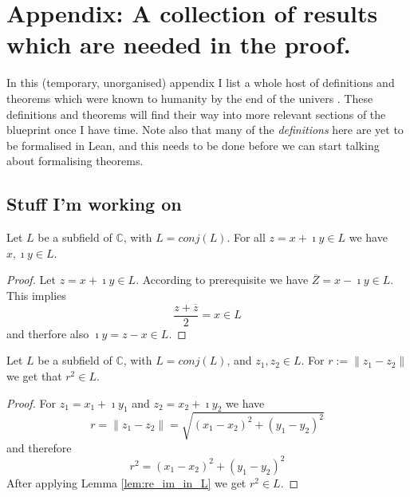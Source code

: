 \chapter{Appendix: A collection of results which are needed in the proof.}
\label{ch_bestiary}
In this (temporary, unorganised) appendix I list a whole host of definitions and theorems which were known to humanity by the end of the univers \cite{JAN_SCHRÖER:2023}. These definitions and theorems will find their way into more relevant sections of the blueprint once I have time. Note also that many of the \emph{definitions} here are yet to be formalised in Lean, and this needs to be done before we can start talking about formalising theorems.


\section*{Stuff I'm working on}




\begin{lemma}
    \label{lem:re_im_in_L}
    Let $L$ be a subfield of $\mathbb{C}$, with $L = conj(L)$. For all $z = x + \imath y \in L$ we have $x, \imath y \in L$.
\end{lemma}
\begin{proof}
    Let $z = x + \imath y \in L$. According to prerequisite we have $\overline{Z}=x-\imath y \in L$. This implies
    \begin{equation*}
        \frac{z + \overline{z}}{2} = x \in L
    \end{equation*}
    and therfore also $\imath y = z - x \in L$.
\end{proof}

\begin{lemma}
    \label{lem:dist_sqard_in_L}
    Let $L$ be a subfield of $\mathbb{C}$, with $L = conj(L)$, and $z_1, z_2 \in L$.
    For $r := \|z_1-z_2\|$ we get that $r^2 \in L$.
\end{lemma}
\begin{proof}
    For $z_1 = x_1 + \imath y_1$ and $z_2 = x_2 + \imath y_2$ we have
    \begin{equation*}
        r = \|z_1 - z_2\| = \sqrt{(x_1 - x_2)^2 + (y_1 - y_2)^2}
    \end{equation*}
    and therefore
    \begin{equation*}
        r^2 = (x_1 - x_2)^2 + (y_1 - y_2)^2 
    \end{equation*}
    After applying Lemma \ref{lem:re_im_in_L} we get $r^2 \in L$.
\end{proof}

